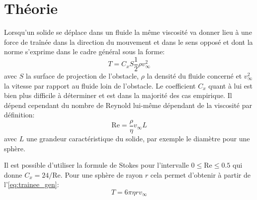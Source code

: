 \section{Théorie}


Lorsqu'un solide se déplace dans un fluide la même viscosité va donner lieu à une force de traînée dans la direction du mouvement et dans le sens opposé et dont la norme s'exprime dans le cadre général sous la forme:
\begin{equation}
    T = C_x S \frac{1}{2} \rho v_\infty ^2
    \label{eq:trainee_gen}
\end{equation}
avec $S$ la surface de projection de l'obstacle, $\rho$ la densité du fluide concerné et \(v_\infty ^2\) la vitesse par rapport au fluide loin de l'obstacle. Le coefficient $C_x$ quant à lui est bien plus difficile à déterminer et est dans la majorité des cas empirique. Il dépend cependant du nombre de Reynold lui-même dépendant de la viscosité par définition:
\begin{equation}
    \mathrm{Re} = \frac{\rho}{\eta}v_\infty L
    \label{eq:Reynolds}
\end{equation}
avec $L$ une grandeur caractéristique du solide, par exemple le diamètre pour une sphère.

Il est possible d'utiliser la formule de Stokes pour l'intervalle $0 \leq \mathrm{Re} \leq 0.5$ qui donne \hbox{$C_x = 24/\mathrm{Re}$}. Pour une sphère de rayon $r$ cela permet d'obtenir à partir de l'\autoref{eq:trainee_gen}:
\begin{equation}
    T = 6 \pi \eta r v_\infty
    \label{eq:trainee_stokes}
\end{equation}

